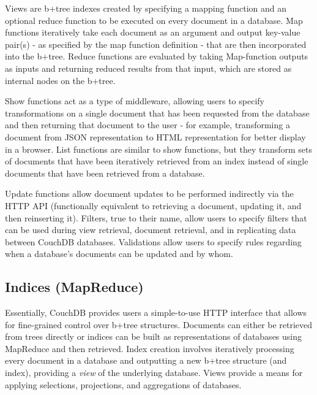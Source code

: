 Views are b+tree indexes created by specifying a mapping function and an optional reduce function to be executed on every document in a database. Map functions iteratively take each document as an argument and output key-value pair(s) - as specified by the map function definition - that are then incorporated into the b+tree. Reduce functions are evaluated by taking Map-function outputs as inputs and returning reduced results from that input, which are stored as internal nodes on the b+tree.

Show functions act as a type of middleware, allowing users to specify transformations on a single document that has been requested from the database and then returning that document to the user - for example, transforming a document from JSON representation to HTML representation for better display in a browser. List functions are similar to show functions, but they transform sets of documents that have been iteratively retrieved from an index instead of single documents that have been retrieved from a database.

Update functions allow document updates to be performed indirectly via the HTTP API (functionally equivalent to retrieving a document, updating it, and then reinserting it). Filters, true to their name, allow users to specify filters that can be used during view retrieval, document retrieval, and in replicating data between CouchDB databases. Validations allow users to specify rules regarding when a database’s documents can be updated and by whom.

\subsection{Indices (MapReduce)}
Essentially, CouchDB provides users a simple-to-use HTTP interface that allows for fine-grained control over b+tree structures. Documents can either be retrieved from trees directly or indices can be built as representations of databases using MapReduce and then retrieved. Index creation involves iteratively processing every document in a database and outputting a new b+tree structure (and index), providing a \textit{view} of the underlying database. Views provide a means for applying selections, projections, and aggregations of databases.

